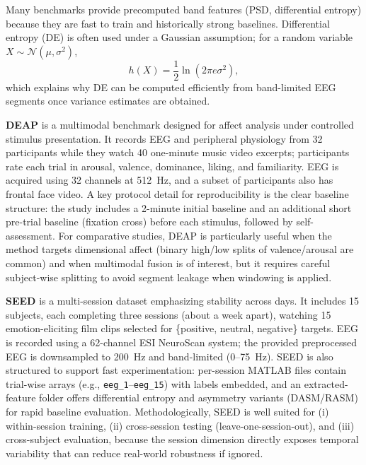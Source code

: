\documentclass{WileyMSP-template}
\begin{document}
Many benchmarks provide precomputed band features (PSD, differential entropy) because they are fast to train and historically strong baselines. Differential entropy (DE) is often used under a Gaussian assumption; for a random variable $X\sim\mathcal{N}(\mu,\sigma^2)$,
\begin{equation}
h(X)=\frac{1}{2}\ln\!\left(2\pi e \sigma^2\right),
\label{eq:de_gaussian}
\end{equation}
which explains why DE can be computed efficiently from band-limited EEG segments once variance estimates are obtained. \cite{seediv_page,duan2013de}


\textbf{DEAP}
 is a multimodal benchmark designed for affect analysis under controlled stimulus presentation. It records EEG and peripheral physiology from 32 participants while they watch 40 one-minute music video excerpts; participants rate each trial in arousal, valence, dominance, liking, and familiarity. EEG is acquired using 32 channels at 512~Hz, and a subset of participants also has frontal face video. \cite{koelstra2012deap}
A key protocol detail for reproducibility is the clear baseline structure: the study includes a 2-minute initial baseline and an additional short pre-trial baseline (fixation cross) before each stimulus, followed by self-assessment. \cite{koelstra2012deap}
For comparative studies, DEAP is particularly useful when the method targets dimensional affect (binary high/low splits of valence/arousal are common) and when multimodal fusion is of interest, but it requires careful subject-wise splitting to avoid segment leakage when windowing is applied. \cite{kukhilava2025evaluation,brookshire2024leakage}

\textbf{SEED}
 is a multi-session dataset emphasizing stability across days. It includes 15 subjects, each completing three sessions (about a week apart), watching 15 emotion-eliciting film clips selected for \{positive, neutral, negative\} targets. EEG is recorded using a 62-channel ESI NeuroScan system; the provided preprocessed EEG is downsampled to 200~Hz and band-limited (0--75~Hz). \cite{seed_page}
SEED is also structured to support fast experimentation: per-session MATLAB files contain trial-wise arrays (e.g., \texttt{eeg\_1}--\texttt{eeg\_15}) with labels embedded, and an extracted-feature folder offers differential entropy and asymmetry variants (DASM/RASM) for rapid baseline evaluation. \cite{seed_page,duan2013de}
Methodologically, SEED is well suited for (i) within-session training, (ii) cross-session testing (leave-one-session-out), and (iii) cross-subject evaluation, because the session dimension directly exposes temporal variability that can reduce real-world robustness if ignored. \cite{kukhilava2025evaluation}
\end{document}
